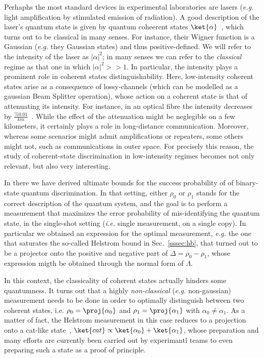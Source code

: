Perhaphs the most standard devices in experimental laboratories are lasers (\textit{e.g.} light amplification by stimulated emission of radiation). A good description of the laser's quantum state is given by quantum coheerent states $\ket{\alpha}$~\cite{ref:molmer_coh}, which turns out to be classical in many senses. For instance, their Wigner function is a Gaussian (\textit{e.g.} they Gaussian states) and thus positive-defined. We will refer to the intensity of the laser as $|\alpha|^2$; in many senses we can refer to the \textit{classical} regime as that one in which $|\alpha|^{2} >> 1$. In particular, the intensity plays a prominent role in coherent states distinguishability. Here, low-intensity coherent states arise as a consequence of lossy-channels (which can be modelled as a gaussian Beam Splitter operation), whose action on a coherent state is that of attenuating its intensity. For instance, in an optical fibre the intensity decreases by $\frac{\%0.01}{km}$~\cite{ref:dec_bs_of}. While the effect of the attenuation might be neglegible on a few kilometers, it certainly plays a role in long-distance communication. Moreover, whereas some scenarios might admit amplifications or repeaters, some others might not, such as communications in outer space. For precisely this reason, the study of coherent-state discrimination in low-intensity regimes becomes not only relevant, but also very interesting.

In there we have derived ultimate bounds for the success probability of of binary-state quantum discrimination. In that setting, either $\rho_0$ or $\rho_1$ stands for the correct description of the quantum system, and the goal is to perform a measurement that maximizes the error probability of mis-identifying the quantum state, in the single-shot setting (\textit{i.e.} single measurement, on a single copy). In particular we obtained an expression for the optimal measurement, \textit{e.g.} the one that saturates the so-called Helstrom bound in Sec.~\ref{sssec:hb}, that turned out to be a projector onto the positive and negative part of $\Delta = \rho_0 - \rho_1$, whose expression migth be obtained through the normal form of $\Lambda$.

In this context, the classicality of coherent states actually hinders some quantumness. It turns out that a highly \textit{non-classical} (\textit{e.g.} non-gaussian) measurement needs to be done in order to optimally distinguish between two coherent states, i.e. $\rho_0 = \proj{\alpha_0}$ and $\rho_1 = \proj{\alpha_1}$ with $\alpha_0 \neq \alpha_1$. As a matter of fact, the Helstrom measurement in this case reduces to a projection onto a cat-like state~\cite{ref:cat_jap}, $\ket{cat}\propto \ket{\alpha_0} + \ket{\alpha_1}$, whose preparation and many efforts are currently been carried out by experimantl teams to even preparing such a state as a proof of principle.

